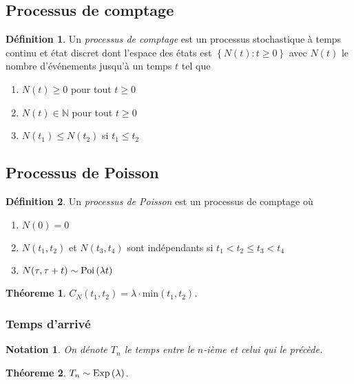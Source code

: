\documentclass[11pt]{article}
\makeatletter
\newcommand\Poi[1]{%
	\ensuremath{%
		\mathrm{Poi}\left(#1\right)%
	}%
}%
\newcommand\Exp[1]{%
	\ensuremath{%
		\mathrm{Exp}\left(#1\right)%
	}%
}%
\newtheorem{theoreme}{Théoreme}[section]
\newtheorem*{notation}{Notation}
\theoremstyle{remark}
\theoremstyle{definition}
\newtheorem*{@definition}{Définition}
\newenvironment{definition}{%
	\begin{@definition}%
}{%
	\end{@definition}%
	\setcounter{property}{0}%
}
\makeatother
\begin{document}
\subsection{Processus de comptage}
\begin{definition}
	Un \textit{processus de comptage} est un processus stochastique à temps
	continu et état discret dont l'espace des états est $\left\{N(t):t\geq 0
	\right\}$ avec $N(t)$ le nombre d'événements jusqu'à un temps $t$ tel que
	\begin{enumerate}
		\item $N(t)\geq 0$ pour tout $t\geq 0$
		\item $N(t)\in\mathbb{N}$ pour tout $t\geq 0$
		\item $N(t_1)\leq N(t_2)$ si $t_1\leq t_2$
	\end{enumerate}
\end{definition}

\subsection{Processus de Poisson}
\begin{definition}
	Un \textit{processus de Poisson} est un processus de comptage où
	\begin{enumerate}
		\item $N(0)=0$
		\item $N(t_1,t_2)$ et $N(t_3,t_4)$ sont indépendants si $t_1<t_2\leq
		      t_3<t_4$
		\item $N(\tau,\tau+t)\sim\Poi{\lambda t}$
	\end{enumerate}
\end{definition}

\begin{theoreme}
	$C_N(t_1,t_2)=\lambda\cdot\mathrm{min}(t_1,t_2)$.
\end{theoreme}

\subsubsection{Temps d'arrivé}
\begin{notation}
	On dénote $T_n$ le temps entre le $n$-ième et celui qui le précède.
\end{notation}

\begin{theoreme}
	$T_n\sim\Exp{\lambda}$.
\end{theoreme}
\end{document}
